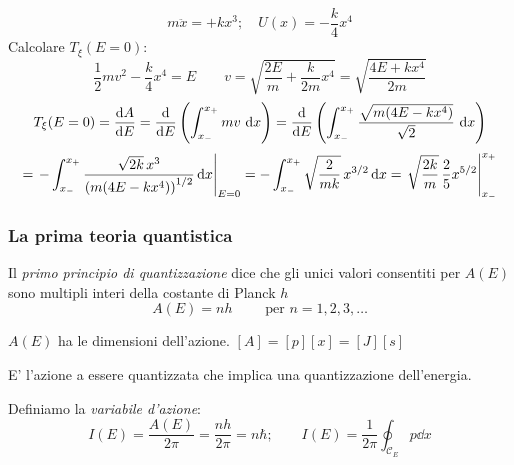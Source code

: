 \begin{example}
    \begin{equation*}
        m\ddot{x}=+kx^3;\quad U(x) = -\frac{k}{4}x^4
    \end{equation*}
    Calcolare $T_\xi(E = 0)$:
    \begin{equation*}
        \frac{1}{2}mv^2 - \frac{k}{4}x^4 = E \qquad 
        v = \sqrt{\frac{2E}{m} + \frac{k}{2m}x^4} = \sqrt{\frac{4E + kx^4}{2m}}
    \end{equation*}
    \begin{equation*}
        T_\xi(E=0) = \dv{A}{E} = \dv{E} \left( \int_{x_-}^{x_+} mv \, \dd{x} \right) 
        = \dv{E} \left( \int_{x_-}^{x_+} \frac{\sqrt{m(4E - kx^4)}}{\sqrt{2}} \, \dd{x} \right)
    \end{equation*}
    \begin{equation*}
        = \left. -\int_{x_-}^{x_+} \frac{\sqrt{2k} \, x^3}{\left( m(4E - kx^4) \right)^{1/2}} \dd{x} \right|_{E=0}
        = - \int_{x_-}^{x_+} \sqrt{\frac{2}{m k}} \, x^{3/2} \dd{x}
        = \eval{\sqrt{\frac{2k}{m}} \, \frac{2}{5} x^{5/2}}_{x_-}^{x_+}
    \end{equation*}

\end{example}



\subsubsection{La prima teoria quantistica}
\begin{proposition}
    Il \textit{primo principio di quantizzazione} dice che gli unici valori consentiti per $A(E)$ sono 
    multipli interi della costante di Planck $h $
    \begin{equation}
        A(E )= n h \qquad \text{ per } n = 1,2,3,\dots
    \end{equation}
\end{proposition}
\begin{remark}
    $A(E )$ ha le dimensioni dell'azione. $[A]= [p][x]=[J][s]$
\end{remark}
E' l'azione a essere quantizzata che implica una quantizzazione dell'energia.
\begin{definition}
    Definiamo la \textit{variabile d'azione}:
    \begin{equation}
        I (E )=  \frac{A(E)}{2\pi}= \frac{nh}{2\pi}=n \hbar  ; \qquad I(E ) = \frac{1}{2\pi}\oint_{\mathcal{C}_E }p \dd{x}
    \end{equation}
\end{definition}


